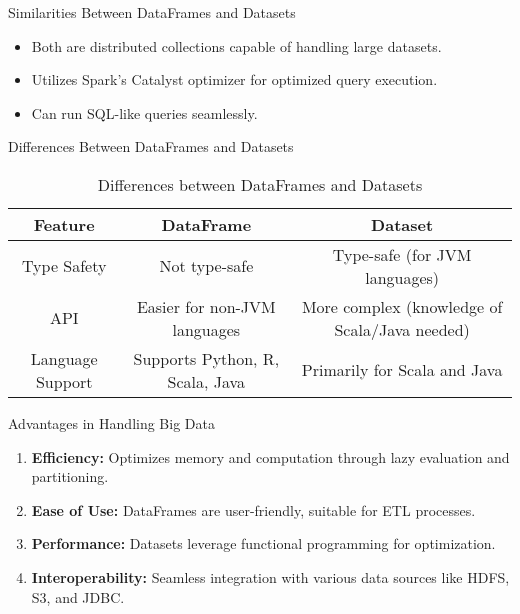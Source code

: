 \documentclass[aspectratio=169]{beamer}
\begin{document}
\begin{frame}{Similarities Between DataFrames and Datasets}
    \begin{itemize}
        \item Both are distributed collections capable of handling large datasets.
        \item Utilizes Spark's Catalyst optimizer for optimized query execution.
        \item Can run SQL-like queries seamlessly.
    \end{itemize}
\end{frame}

\begin{frame}{Differences Between DataFrames and Datasets}
    \begin{table}[]
        \centering
        \begin{tabular}{|c|c|c|}
            \hline
            Feature            & DataFrame                          & Dataset                          \\ \hline
            Type Safety        & Not type-safe                      & Type-safe (for JVM languages)   \\ \hline
            API                & Easier for non-JVM languages      & More complex (knowledge of Scala/Java needed) \\ \hline
            Language Support    & Supports Python, R, Scala, Java  & Primarily for Scala and Java     \\ \hline
        \end{tabular}
        \caption{Differences between DataFrames and Datasets}
    \end{table}
\end{frame}

\begin{frame}{Advantages in Handling Big Data}
    \begin{enumerate}
        \item \textbf{Efficiency:} Optimizes memory and computation through lazy evaluation and partitioning.
        \item \textbf{Ease of Use:} DataFrames are user-friendly, suitable for ETL processes.
        \item \textbf{Performance:} Datasets leverage functional programming for optimization.
        \item \textbf{Interoperability:} Seamless integration with various data sources like HDFS, S3, and JDBC.
    \end{enumerate}
\end{frame}
\end{document}
